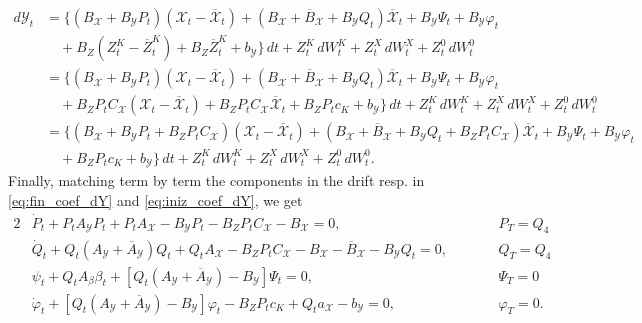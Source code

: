 \documentclass[11pt,twoside]{amsart}
\theoremstyle{definition}
\numberwithin{equation}{section}
\begin{document}
\begin{align}\label{eq:fin_coef_dY}
    d{\mathcal{Y}}_t 
    & = \Big\{(B_{\mathcal{X}}+B_{\mathcal{Y}} {P}_t) ({\mathcal{X}}_t - \overline{{\mathcal{X}}}_t) + (B_{\mathcal{X}}+\overline{B}_{\mathcal{X}}+   B_{\mathcal{Y}} Q_t) \overline{{\mathcal{X}}}_t +   B_{\mathcal{Y}}  \Psi_t +  B_{\mathcal{Y}}\varphi_t \\ 
    &\nonumber \quad + B_Z ({Z}^K_t-\overline{Z}^K_t) + B_Z \overline{Z}^K_t + b_\mathcal{Y}\Big\}\,dt + {Z}^K_t\,d{W}_t^{K} + {Z}^X_t\,dW_t^{X}+ {Z}^0_t\,dW_t^{0}\\  
    & \nonumber= \Big\{(B_{\mathcal{X}}+B_{\mathcal{Y}} {P}_t) ({\mathcal{X}}_t - \overline{{\mathcal{X}}}_t) + (B_{\mathcal{X}}+\overline{B}_{\mathcal{X}}+   B_{\mathcal{Y}} Q_t) \overline{{\mathcal{X}}}_t +   B_{\mathcal{Y}} \Psi_t + B_{\mathcal{Y}}\varphi_t \\  
    &\nonumber \quad + B_Z {P}_t C_{\mathcal{X}}({\mathcal{X}}_t - \overline{{\mathcal{X}}}_t) + B_Z {P}_t C_{\mathcal{X}} \overline{{\mathcal{X}}}_t + B_Z P_tc_K + b_\mathcal{Y}\Big\}\,dt + {Z}^K_t\,d{W}_t^{K} + {Z}^X_t\,dW_t^{X}+ {Z}^0_t\,dW_t^{0}\\
    &\nonumber = \Big\{(B_{\mathcal{X}}+B_{\mathcal{Y}} {P}_t  + B_Z {P}_t C_{\mathcal{X}}) ({\mathcal{X}}_t - \overline{{\mathcal{X}}}_t) + (B_{\mathcal{X}}+\overline{B}_{\mathcal{X}}+   B_{\mathcal{Y}} Q_t + B_Z {P}_t C_{\mathcal{X}} ) \overline{{\mathcal{X}}}_t + B_{\mathcal{Y}}  \Psi_t + B_{\mathcal{Y}}\varphi_t \\  
    &\nonumber \quad + B_Z P_tc_K + b_\mathcal{Y}\Big\}\,dt + {Z}^K_t\,d{W}_t^{K} + {Z}^X_t\,dW_t^{X}+ {Z}^0_t\,dW_t^{0}.
\end{align}
Finally, matching term by term the components in the drift resp. in \eqref{eq:fin_coef_dY} and \eqref{eq:iniz_coef_dY}, we get
\begin{alignat}{2}
    & \dot{{P}}_t +{P}_t A_{\mathcal{Y}} {P}_t + {P}_t A_{\mathcal{X}}  - B_{\mathcal{Y}} {P}_t  - B_Z {P}_t C_{\mathcal{X}} - B_{\mathcal{X}} = 0,&& {P_T = Q_4}\\
    & \dot{Q}_t + Q_t (A_{\mathcal{Y}}+ \overline{A}_{\mathcal{Y}}) Q_t + Q_t A_{\mathcal{X}} - B_Z {P}_t C_{\mathcal{X}} - B_{\mathcal{X}} - \overline{B}_{\mathcal{X}} -   B_{\mathcal{Y}} Q_t  = 0,\qquad&& {Q_T = Q_4}\\
    &\label{eqn: psi} \psi_t + Q_t A_\beta \beta_t + [Q_t (A_{\mathcal{Y}}+ \overline{A}_{\mathcal{Y}})- B_{\mathcal{Y}}] {\Psi_t} =0,&& {\Psi_T = 0}\\
    & \dot{\varphi}_t  + [Q_t (A_{\mathcal{Y}}+ \overline{A}_{\mathcal{Y}}) - B_{\mathcal{Y}}]\varphi_t - B_Z P_tc_K + Q_t a_\mathcal{X} - b_\mathcal{Y} =0, &&{\varphi_T = 0}.
\end{alignat}
\end{document}
